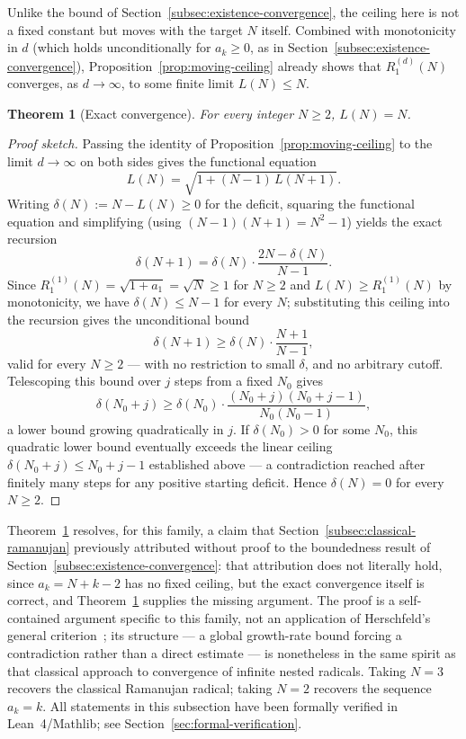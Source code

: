 \documentclass[11pt,a4paper]{amsart}
\theoremstyle{plain}
\newtheorem{theorem}{Theorem}
\theoremstyle{definition}
\theoremstyle{remark}
\begin{document}
Unlike the bound of Section~\ref{subsec:existence-convergence}, the ceiling here is not a fixed constant but moves with the target $N$ itself. Combined with monotonicity in $d$ (which holds unconditionally for $a_k \ge 0$, as in Section~\ref{subsec:existence-convergence}), Proposition~\ref{prop:moving-ceiling} already shows that $R_1^{(d)}(N)$ converges, as $d \to \infty$, to some finite limit $L(N) \le N$.

\begin{theorem}[Exact convergence]
\label{thm:exact-convergence}
For every integer $N \ge 2$, $L(N) = N$.
\end{theorem}

\begin{proof}[Proof sketch]
Passing the identity of Proposition~\ref{prop:moving-ceiling} to the limit $d \to \infty$ on both sides gives the functional equation
\[
L(N) = \sqrt{1 + (N-1)\, L(N+1)}.
\]
Writing $\delta(N) := N - L(N) \ge 0$ for the deficit, squaring the functional equation and simplifying (using $(N-1)(N+1)=N^2-1$) yields the exact recursion
\[
\delta(N+1) = \delta(N)\cdot \frac{2N - \delta(N)}{N-1}.
\]
Since $R_1^{(1)}(N) = \sqrt{1+a_1} = \sqrt{N} \ge 1$ for $N \ge 2$ and $L(N) \ge R_1^{(1)}(N)$ by monotonicity, we have $\delta(N) \le N-1$ for every $N$; substituting this ceiling into the recursion gives the unconditional bound
\[
\delta(N+1) \ge \delta(N)\cdot \frac{N+1}{N-1},
\]
valid for every $N \ge 2$ — with no restriction to small $\delta$, and no arbitrary cutoff. Telescoping this bound over $j$ steps from a fixed $N_0$ gives
\[
\delta(N_0+j) \ge \delta(N_0)\cdot \frac{(N_0+j)(N_0+j-1)}{N_0(N_0-1)},
\]
a lower bound growing quadratically in $j$. If $\delta(N_0) > 0$ for some $N_0$, this quadratic lower bound eventually exceeds the linear ceiling $\delta(N_0+j) \le N_0+j-1$ established above — a contradiction reached after finitely many steps for any positive starting deficit. Hence $\delta(N) = 0$ for every $N \ge 2$. \qedhere
\end{proof}

Theorem~\ref{thm:exact-convergence} resolves, for this family, a claim that Section~\ref{subsec:classical-ramanujan} previously attributed without proof to the boundedness result of Section~\ref{subsec:existence-convergence}: that attribution does not literally hold, since $a_k = N+k-2$ has no fixed ceiling, but the exact convergence itself is correct, and Theorem~\ref{thm:exact-convergence} supplies the missing argument. The proof is a self-contained argument specific to this family, not an application of Herschfeld's general criterion~\cite{Herschfeld1935}; its structure — a global growth-rate bound forcing a contradiction rather than a direct estimate — is nonetheless in the same spirit as that classical approach to convergence of infinite nested radicals. Taking $N=3$ recovers the classical Ramanujan radical; taking $N=2$ recovers the sequence $a_k=k$. All statements in this subsection have been formally verified in Lean~4/Mathlib; see Section~\ref{sec:formal-verification}.
\end{document}
